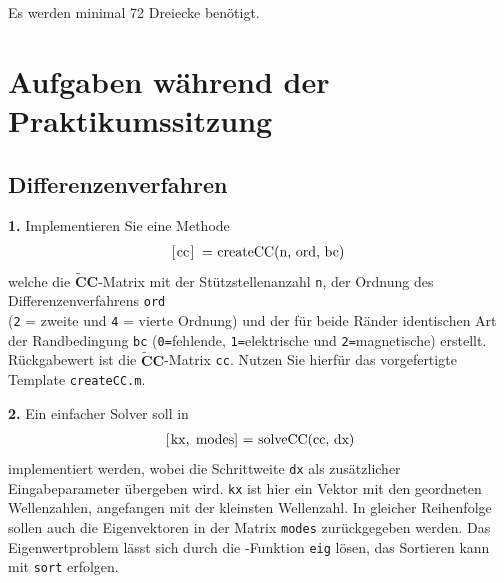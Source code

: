 \documentclass[Protokollheft.tex]{subfiles}
\begin{document}
	Es werden minimal 72 Dreiecke benötigt.
	
	\section{Aufgaben während der Praktikumssitzung}
	{\subsection{Differenzenverfahren}}
	
	\begin{framed}
		\noindent \textbf{1.} Implementieren Sie eine Methode
		\begin{align}
			\lstinline{[cc] = createCC(n, ord, bc)}\; \label{meth:createCC}
		\end{align}     
		welche die $\tilde{\textbf{C}}\textbf{C}$-Matrix mit der Stützstellenanzahl \lstinline{n}, der Ordnung des Differenzenverfahrens
		\lstinline{ord}\\ (\lstinline{2} = zweite und \lstinline{4} = vierte Ordnung) und der für beide Ränder identischen Art der Randbedingung \lstinline{bc} (\lstinline{0=}fehlende, \lstinline{1=}elektrische und  \lstinline{2=}magnetische) erstellt.
		Rückgabewert ist die $\tilde{\textbf{C}}\textbf{C}$-Matrix \lstinline{cc}. Nutzen Sie hierfür das vorgefertigte Template \lstinline{createCC.m}.\label{exer:createCC}
	\end{framed}
	
	
	\begin{framed}
		\noindent \textbf{2.} Ein einfacher Solver soll in
		\begin{align}
			\lstinline{[kx, modes] = solveCC(cc, dx)} \label{meth:solveCC}
		\end{align}
		implementiert werden, wobei die Schrittweite \lstinline{dx} als zusätzlicher Eingabeparameter übergeben wird.
		\lstinline{kx} ist hier ein Vektor mit den geordneten Wellenzahlen, angefangen mit der kleinsten Wellenzahl. In gleicher
		Reihenfolge sollen auch die Eigenvektoren in der Matrix \lstinline{modes} zurückgegeben werden.
		Das Eigenwertproblem lässt sich durch die \matlab-Funktion \lstinline{eig} lösen, das Sortieren kann mit \lstinline{sort} erfolgen.\label{exer:solveCC}
	\end{framed}
	
	
\end{document}
